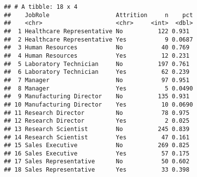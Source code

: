 \documentclass[
]{article}
\newenvironment{Shaded}{\begin{snugshade}}{\end{snugshade}}
\newcommand{\CommentTok}[1]{\textcolor[rgb]{0.56,0.35,0.01}{\textit{#1}}}
\newcommand{\ControlFlowTok}[1]{\textcolor[rgb]{0.13,0.29,0.53}{\textbf{#1}}}
\newcommand{\DataTypeTok}[1]{\textcolor[rgb]{0.13,0.29,0.53}{#1}}
\newcommand{\KeywordTok}[1]{\textcolor[rgb]{0.13,0.29,0.53}{\textbf{#1}}}
\newcommand{\NormalTok}[1]{#1}
\newcommand{\OperatorTok}[1]{\textcolor[rgb]{0.81,0.36,0.00}{\textbf{#1}}}
\newcommand{\StringTok}[1]{\textcolor[rgb]{0.31,0.60,0.02}{#1}}
\begin{document}
\begin{Shaded}
\end{Shaded}

\begin{verbatim}
## # A tibble: 18 x 4
##    JobRole                   Attrition     n    pct
##    <chr>                     <chr>     <int>  <dbl>
##  1 Healthcare Representative No          122 0.931 
##  2 Healthcare Representative Yes           9 0.0687
##  3 Human Resources           No           40 0.769 
##  4 Human Resources           Yes          12 0.231 
##  5 Laboratory Technician     No          197 0.761 
##  6 Laboratory Technician     Yes          62 0.239 
##  7 Manager                   No           97 0.951 
##  8 Manager                   Yes           5 0.0490
##  9 Manufacturing Director    No          135 0.931 
## 10 Manufacturing Director    Yes          10 0.0690
## 11 Research Director         No           78 0.975 
## 12 Research Director         Yes           2 0.025 
## 13 Research Scientist        No          245 0.839 
## 14 Research Scientist        Yes          47 0.161 
## 15 Sales Executive           No          269 0.825 
## 16 Sales Executive           Yes          57 0.175 
## 17 Sales Representative      No           50 0.602 
## 18 Sales Representative      Yes          33 0.398
\end{verbatim}
\end{document}
